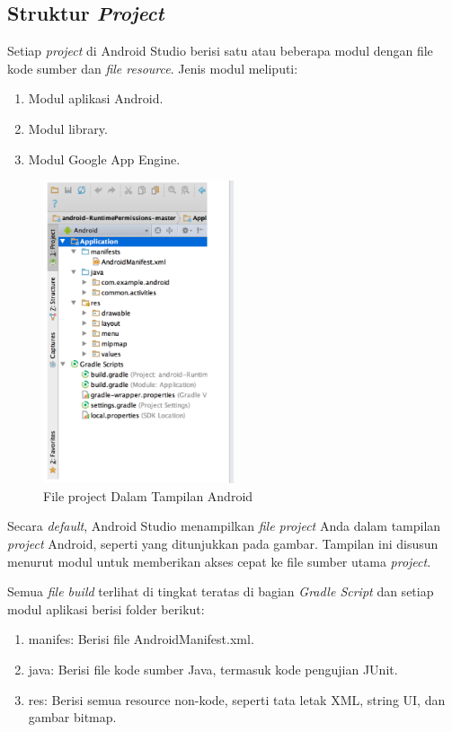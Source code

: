 \subsection{Struktur \textit{Project}}
\par Setiap \textit{project} di Android Studio berisi satu atau beberapa modul dengan file kode sumber dan \textit{file resource}. Jenis modul meliputi:
\begin{enumerate}
    \item Modul aplikasi Android.
    \item Modul library.
    \item Modul Google App Engine.
\end{enumerate}
\begin{figure}[H]
    \centering
    \includegraphics[width=0.5\textwidth]{figures/android4.png}
    \caption{ File project Dalam Tampilan Android}
    \label{print}
    \end{figure}
\par Secara \textit{default}, Android Studio menampilkan \textit{file project} Anda dalam tampilan \textit{project} Android, seperti yang ditunjukkan pada gambar. Tampilan ini disusun menurut modul untuk memberikan akses cepat ke file sumber utama \textit{project}.
\par Semua\textit{ file build } terlihat di tingkat teratas di bagian\textit{ Gradle Script} dan setiap modul aplikasi berisi folder berikut:
\begin{enumerate}
    \item manifes: Berisi file AndroidManifest.xml.
    \item java: Berisi file kode sumber Java, termasuk kode pengujian JUnit.
    \item res: Berisi semua resource non-kode, seperti tata letak XML, string UI, dan gambar bitmap.
    \end{enumerate}
    
